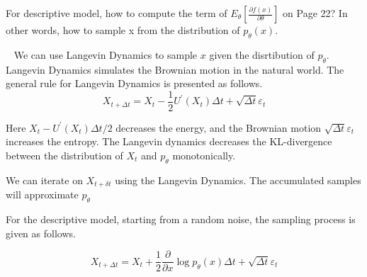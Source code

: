 \begin{exercise}[]{For descriptive model, how to compute the term of $E_\theta [\frac{\partial f(x)}{\partial \theta}]$ on Page 22? In other words, how to sample x from the distribution of $p_\theta(x)$.}
  \begin{solution}
  \par{~}
  We can use Langevin Dynamics to sample $x$ given the disrtibution of $p_\theta$. Langevin Dynamics simulates the Brownian motion in the natural world. The general rule for Langevin Dynamics is presented as follows.
  \begin{equation}
    X_{t+\Delta t}=X_{t}-\frac{1}{2} U^{\prime}\left(X_{t}\right) \Delta t+\sqrt{\Delta t} \varepsilon_{t}
  \end{equation}

  Here $X_{t}-U^{\prime}\left(X_{t}\right) \Delta t / 2$ decreases the energy, and the Brownian motion $\sqrt{\Delta t} \varepsilon_{t}$ increases the entropy. The Langevin dynamics decreases the KL-divergence between the distribution of $X_{t}$ and $p_{\theta}$ monotonically.

  We can iterate on $X_{t+\delta t}$ using the Langevin Dynamics. The accumulated samples will approximate $p_{\theta}$

  For the descriptive model, starting from a random noise, the sampling process is given as follows.

  \begin{equation}
    X_{t+\Delta t}=X_{t}+\frac{1}{2} \frac{\partial}{\partial x} \log p_{\theta}\left(x\right) \Delta t+\sqrt{\Delta t} \varepsilon_{t}
  \end{equation}
  

  \end{solution}
  \label{ex4}
\end{exercise}

